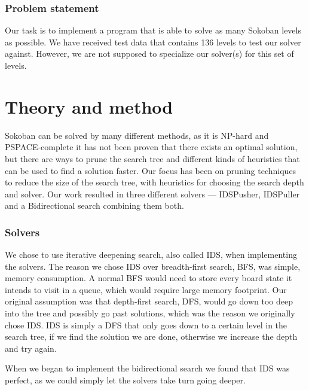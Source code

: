 \documentclass[a4paper,11pt]{article}
\renewcommand{\*}[0]{\cdot}
\begin{document}
\section{Problem statement}


Our task is to implement a program that is able to solve as many Sokoban levels
as possible. We have received test data that contains 136 levels to test our
solver against. However, we are not supposed to specialize our solver(s) for
this set of levels.


\part*{Theory and method}


Sokoban can be solved by many different methods, as it is NP-hard and
PSPACE-complete it has not been proven that there exists an optimal solution,
but there are ways to prune the search tree and different kinds of heuristics
that can be used to find a solution faster. Our focus has been on pruning
techniques to reduce the size of the search tree, with heuristics for choosing
the search depth and solver. Our work resulted in three different solvers ---
IDSPusher, IDSPuller and a Bidirectional search combining them both.


\section{Solvers}

We chose to use iterative deepening search, also called IDS, when
implementing the solvers. The reason we chose IDS over breadth-first search,
BFS, was simple, memory consumption. A normal BFS would need to store every
board state it intends to visit in a queue, which would require large memory
footprint. Our original assumption was that depth-first search, DFS, would go
down too deep into the tree and possibly go past solutions, which was the
reason we originally chose IDS. IDS is simply a DFS that only goes down to a
certain level in the search tree, if we find the solution we are done, otherwise we
increase the depth and try again.

When we began to implement the bidirectional search we found that IDS was
perfect, as we could simply let the solvers take turn going deeper.
\end{document}
